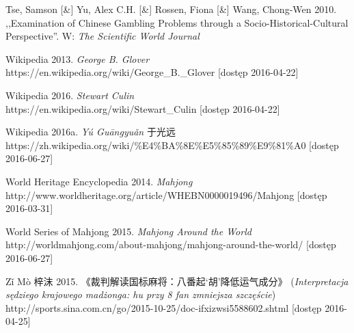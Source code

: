 Tse, Samson [\&] Yu, Alex C.H. [\&] Rossen, Fiona [\&] Wang, Chong-Wen
2010.
,,Examination of Chinese Gambling Problems through a Socio-Historical-Cultural Perspective''. W: \textit{The
Scientific World Journal}

Wikipedia 2013. \textit{George B. Glover}
\\https://en.wikipedia.org/wiki/George\_B.\_Glover [dostęp 2016-04-22]

Wikipedia 2016. \textit{Stewart Culin}
\\https://en.wikipedia.org/wiki/Stewart\_Culin [dostęp 2016-04-22]

Wikipedia 2016a. \textit{Yú Guāngyuǎn} 于光远
\\https://zh.wikipedia.org/wiki/\%E4\%BA\%8E\%E5\%85\%89\%E9\%81\%A0 [dostęp
2016-06-27]


World Heritage Encyclopedia 2014. \textit{Mahjong}
\\http://www.worldheritage.org/article/WHEBN0000019496/Mahjong [dostęp
2016-03-31]

World Series of Mahjong 2015. \textit{Mahjong Around the World}
\\http://worldmahjong.com/about-mahjong/mahjong-around-the-world/ [dostęp
2016-06-27]

Zǐ Mò 梓沫 2015. 《裁判解读国标麻将：八番起‘胡’降低运气成分》
(\textit{Interpretacja sędziego krajowego madżonga:
hu przy 8 fan zmniejsza szczęście}) %
\\http://sports.sina.com.cn/go/2015-10-25/doc-ifxizwsi5588602.shtml [dostęp 2016-04-25]



